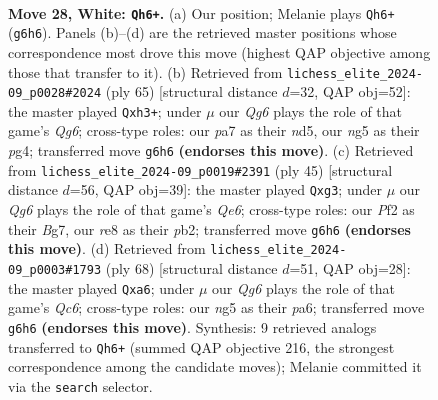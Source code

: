 \documentclass[11pt]{article}
\begin{document}
\clearpage

\begin{figure}[p]\centering
\begin{subfigure}{0.46\textwidth}\centering
\resizebox{\linewidth}{!}{%
\newchessgame
\chessboard[
  setfen={4r2k/p1ppq3/5pQ1/6n1/1pPP4/P7/2P2P1P/1R4K1 w - - 1 28},
  showmover=false,
  pgfstyle=straightmove, color=movearrow, markmove={g6-h6}
]}
\caption{}
\end{subfigure}\hfill
\begin{subfigure}{0.46\textwidth}\centering
\resizebox{\linewidth}{!}{%
\newchessgame
\chessboard[
  setfen={3r2k1/6pp/5p2/1PpN4/p5P1/3P2qP/R3Q3/4R2K b - - 0 33},
  showmover=false,
  pgfstyle=straightmove, color=movearrow, markmove={g3-h3}
]}
\caption{}
\end{subfigure}
\\[4pt]
\begin{subfigure}{0.46\textwidth}\centering
\resizebox{\linewidth}{!}{%
\newchessgame
\chessboard[
  setfen={4r1k1/p5bp/2p3p1/3p4/5p2/2P1q1PP/PP1N4/1R1Q3K b - - 0 23},
  showmover=false,
  pgfstyle=straightmove, color=movearrow, markmove={e3-g3}
]}
\caption{}
\end{subfigure}\hfill
\begin{subfigure}{0.46\textwidth}\centering
\resizebox{\linewidth}{!}{%
\newchessgame
\chessboard[
  setfen={4r2k/6p1/p1Q4p/4q2P/5p2/8/P4PP1/3R2K1 w - - 0 35},
  showmover=false,
  pgfstyle=straightmove, color=movearrow, markmove={c6-a6}
]}
\caption{}
\end{subfigure}
\caption{\textbf{Move 28, White: \texttt{Qh6+}.} (a) Our position; Melanie plays \texttt{Qh6+} (\texttt{g6h6}). Panels (b)--(d) are the retrieved master positions whose correspondence most drove this move (highest QAP objective among those that transfer to it). (b) Retrieved from \texttt{lichess\_elite\_2024-09\_p0028\#2024} (ply 65) [structural distance $d$=32, QAP obj=52]: the master played \texttt{Qxh3+}; under $\mu$ our \emph{Qg6} plays the role of that game's \emph{Qg6}; cross-type roles: our \emph{p}a7 as their \emph{n}d5, our \emph{n}g5 as their \emph{p}g4; transferred move \texttt{g6h6} \textbf{(endorses this move)}. (c) Retrieved from \texttt{lichess\_elite\_2024-09\_p0019\#2391} (ply 45) [structural distance $d$=56, QAP obj=39]: the master played \texttt{Qxg3}; under $\mu$ our \emph{Qg6} plays the role of that game's \emph{Qe6}; cross-type roles: our \emph{P}f2 as their \emph{B}g7, our \emph{r}e8 as their \emph{p}b2; transferred move \texttt{g6h6} \textbf{(endorses this move)}. (d) Retrieved from \texttt{lichess\_elite\_2024-09\_p0003\#1793} (ply 68) [structural distance $d$=51, QAP obj=28]: the master played \texttt{Qxa6}; under $\mu$ our \emph{Qg6} plays the role of that game's \emph{Qc6}; cross-type roles: our \emph{n}g5 as their \emph{p}a6; transferred move \texttt{g6h6} \textbf{(endorses this move)}. Synthesis: 9 retrieved analogs transferred to \texttt{Qh6+} (summed QAP objective 216, the strongest correspondence among the candidate moves); Melanie committed it via the \texttt{search} selector.}
\label{fig:thought-m54}
\end{figure}
\end{document}
